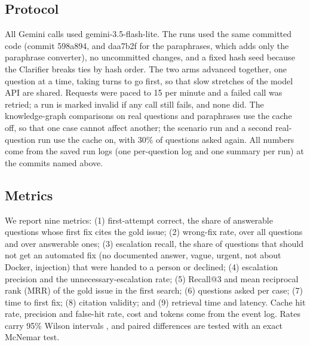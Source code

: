 \documentclass[cameraready]{ieeeconf}
\begin{document}
\subsection{Protocol}
All Gemini calls used gemini-3.5-flash-lite. The runs used the same committed code (commit 598a894, and daa7b2f for the paraphrases, which adds only the paraphrase converter), no uncommitted changes, and a fixed hash seed because the Clarifier breaks ties by hash order. The two arms advanced together, one question at a time, taking turns to go first, so that slow stretches of the model API are shared. Requests were paced to 15 per minute and a failed call was retried; a run is marked invalid if any call still fails, and none did. The knowledge-graph comparisons on real questions and paraphrases use the cache off, so that one case cannot affect another; the scenario run and a second real-question run use the cache on, with 30\% of questions asked again. All numbers come from the saved run logs (one per-question log and one summary per run) at the commits named above.

\subsection{Metrics}
We report nine metrics: (1) first-attempt correct, the share of answerable questions whose first fix cites the gold issue; (2) wrong-fix rate, over all questions and over answerable ones; (3) escalation recall, the share of questions that should not get an automated fix (no documented answer, vague, urgent, not about Docker, injection) that were handed to a person or declined; (4) escalation precision and the unnecessary-escalation rate; (5) Recall@3 and mean reciprocal rank (MRR) of the gold issue in the first search; (6) questions asked per case; (7) time to first fix; (8) citation validity; and (9) retrieval time and latency. Cache hit rate, precision and false-hit rate, cost and tokens come from the event log. Rates carry 95\% Wilson intervals \cite{wilson1927interval}, and paired differences are tested with an exact McNemar test.
\end{document}

